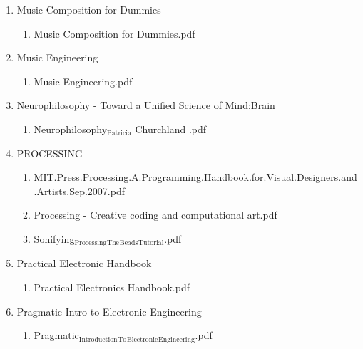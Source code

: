 \documentclass[11pt]{article}
\begin{document}
\begin{enumerate}
\item Music Composition for Dummies
\label{sec-1-1-1-1-49-1-5-17}
\begin{enumerate}
\item Music Composition for Dummies.pdf
\label{sec-1-1-1-1-49-1-5-17-1}
\end{enumerate}

\item Music Engineering
\label{sec-1-1-1-1-49-1-5-18}
\begin{enumerate}
\item Music Engineering.pdf
\label{sec-1-1-1-1-49-1-5-18-1}
\end{enumerate}

\item Neurophilosophy - Toward a Unified Science of Mind:Brain
\label{sec-1-1-1-1-49-1-5-19}
\begin{enumerate}
\item Neurophilosophy$_{\text{Patricia}}$ Churchland .pdf
\label{sec-1-1-1-1-49-1-5-19-1}
\end{enumerate}

\item PROCESSING
\label{sec-1-1-1-1-49-1-5-20}
\begin{enumerate}
\item MIT.Press.Processing.A.Programming.Handbook.for.Visual.Designers.and.Artists.Sep.2007.pdf
\label{sec-1-1-1-1-49-1-5-20-1}

\item Processing - Creative coding and computational art.pdf
\label{sec-1-1-1-1-49-1-5-20-2}

\item Sonifying$_{\text{Processing}}$$_{\text{The}}$$_{\text{Beads}}$$_{\text{Tutorial}}$.pdf
\label{sec-1-1-1-1-49-1-5-20-3}
\end{enumerate}

\item Practical Electronic Handbook
\label{sec-1-1-1-1-49-1-5-21}
\begin{enumerate}
\item Practical Electronics Handbook.pdf
\label{sec-1-1-1-1-49-1-5-21-1}
\end{enumerate}

\item Pragmatic Intro to Electronic Engineering
\label{sec-1-1-1-1-49-1-5-22}
\begin{enumerate}
\item Pragmatic$_{\text{Introduction}}$$_{\text{To}}$$_{\text{Electronic}}$$_{\text{Engineering}}$.pdf
\label{sec-1-1-1-1-49-1-5-22-1}
\end{enumerate}


\end{enumerate}
\end{document}
